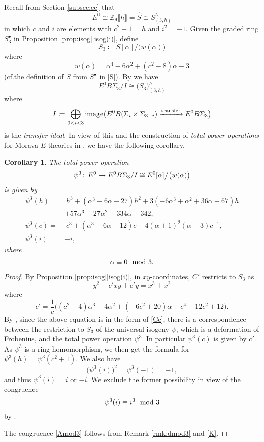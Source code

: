 \documentclass{gtpart}
\newtheorem{cor}[thm]{Corollary}
\theoremstyle{definition}
\theoremstyle{remark}
\def\co{\colon\thinspace}
\newcommand{\mb}[1]{\mathbb{#1}}
\newcommand{\cf}{cf.\thinspace}
\newcommand{\BZ}{{\mb Z}}
\newcommand{\HS}{\widehat{S}}
\newcommand{\md}{~~{\rm mod}~}
\newcommand{\A}{\alpha}
\newcommand{\p}{\psi^3}
\newcommand{\s}{S^\bullet}
\newcommand{\isog}[1]{Proposition \ref{prop:isog}\thinspace \eqref{isog(#1)}}
\begin{document}
Recall from Section \ref{subsec:ec} that 
\[
 E^0 \cong \BZ_9 \llbracket h \rrbracket = \HS \cong S_{(3,h)}^\wedge 
\]
in which $c$ and $i$ are elements with $c^2 + 1 = h$ and $i^2 = -1$.  
Given the graded ring $\s_3$ in \isog{i}, define 
\begin{equation}
\label{S_3}
 S_3 \coloneqq S [\A] / \big( w(\A) \big) 
\end{equation}
where 
\begin{equation}
\label{w}
 w(\A) = \A^4 - 6 \A^2 + (c^2 - 8) \A - 3 
\end{equation}
(\cf the definition of $S$ from $\s$ in \eqref{S}).  
By \cite[Theorem 1.1]{Str98} we have 
\[
 E^0 B\Sigma_3 / I \cong \big( S_3 \big)_{(3,h)}^\wedge 
\]
where 
\begin{equation}
\label{transfer}
 I \coloneqq \bigoplus_{0<i<3} {\rm image} \big( E^0 B(\Sigma_i \times \Sigma_{3-i}) \xrightarrow{\rm transfer} E^0 B\Sigma_3 \big) 
\end{equation}
is the {\em transfer ideal}.  
In view of this and the construction of {\em total power operations} for Morava $E$-theories in \cite[3.23]{cong}, we have the following corollary.  
\begin{cor}
\label{cor:psi3}
 The total power operation 
 \[
  \p \co E^0 \to E^0 B\Sigma_3 / I \cong E^0 [\A] \big/ \big( w(\A) \big) 
 \]
 is given by 
 \begin{equation*}
 \begin{split}
  \p(h) = & ~ h^3 + (\A^3 - 6 \A - 27) h^2 + 3 (-6 \A^3 + \A^2 + 36 \A + 67) h \\
          & + 57 \A^3 - 27 \A^2 - 334 \A - 342, \\
  \p(c) = & ~ c^3 + (\A^3 - 6 \A - 12) c - 4 (\A + 1)^2 (\A - 3) c^{-1}, \\
  \p(i) = & -i, 
 \end{split}
 \end{equation*}
 where 
 \begin{equation}
 \label{Amod3}
  \A \equiv 0 \md 3.  
 \end{equation}
\end{cor}
\begin{proof}
 By \isog{i}, in $xy$-coordinates, $C'$ restricts to $S_3$ as 
 \[
  y^2 + c' x y + c' y = x^3 + x^2 
 \]
 where 
 \[
  c' = \frac{1}{c} \big( (c^2 - 4) \A^3 + 4 \A^2 + (-6 c^2 + 20) \A + c^4 - 12 c^2 + 12 \big).  
 \]
 By \cite[Theorem B]{cong}, since the above equation is in the form of \eqref{Cc}, 
 there is a correspondence between the restriction to $S_3$ of the universal isogeny $\psi$, 
 which is a deformation of Frobenius, and the total power operation $\p$.  
 In particular $\p(c)$ is given by $c'$.  
 As $\p$ is a ring homomorphism, we then get the formula for $\p(h) = \p(c^2 + 1)$.  
 We also have 
 \[
  \big( \p(i) \big)^2 = \p(-1) = -1, 
 \]
 and thus $\p(i) = i$ or $-i$.  We exclude the former possibility in view of the congruence 
 \[
  \p(i) \equiv i^3 \md 3 
 \]
 by \cite[Propositions 3.25 and 10.5]{cong}.  

 The congruence \eqref{Amod3} follows from Remark \ref{rmk:dmod3} and \eqref{K}.  
\end{proof}
\end{document}
